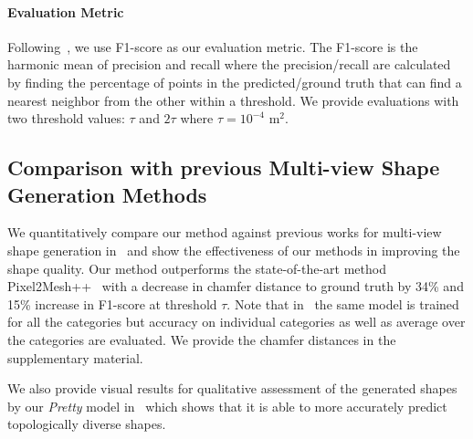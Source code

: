 
\paragraph{Evaluation Metric}\vspace{-4mm}
Following~\cite{wang2018pixel2mesh, wen2019pixel2mesh++}, we use F1-score as our evaluation metric.
The F1-score is the harmonic mean of precision and recall where the precision/recall are calculated by finding the percentage of points in the predicted/ground truth that can find a nearest neighbor from the other within a threshold.
We provide evaluations with two threshold values: $\tau$ and $2\tau$ where $\tau=10^{-4}$  m$^2$.

\vspace{-1mm}
\subsection{Comparison with previous Multi-view Shape Generation Methods}
We quantitatively compare our method against previous works for multi-view shape generation in~ and show the effectiveness of our methods in improving the shape quality. Our method outperforms the state-of-the-art method  Pixel2Mesh++~\cite{wen2019pixel2mesh++} with
a decrease in chamfer distance to ground truth by 34\% and 15\% increase in F1-score at threshold $\tau$.
Note that in~ the same model is trained for all the categories but accuracy on individual categories as well as average over the categories are evaluated.
We provide the chamfer distances in the supplementary material.


We also provide visual results for qualitative assessment of the generated shapes by our \emph{Pretty} model in~ which shows that it is able to more accurately predict topologically diverse shapes.


